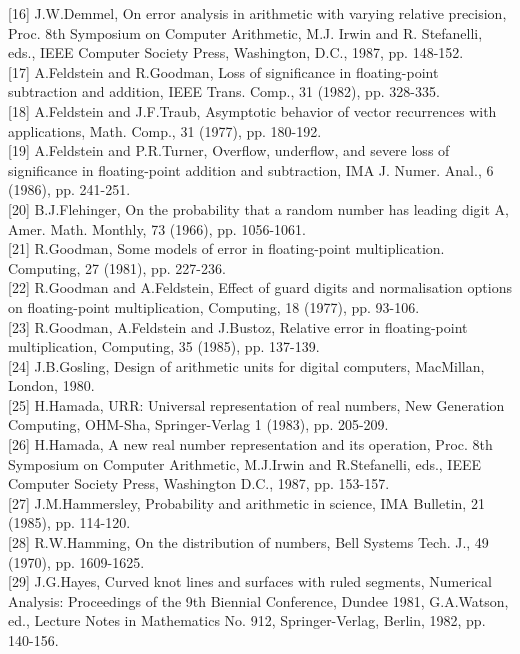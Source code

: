 \documentclass[10pt]{article}
\begin{document}
[16] J.W.Demmel, On error analysis in arithmetic with varying relative precision, Proc. 8th Symposium on Computer Arithmetic, M.J. Irwin and R. Stefanelli, eds., IEEE Computer Society Press, Washington, D.C., 1987, pp. 148-152.\\[0pt]
[17] A.Feldstein and R.Goodman, Loss of significance in floating-point subtraction and addition, IEEE Trans. Comp., 31 (1982), pp. 328-335.\\[0pt]
[18] A.Feldstein and J.F.Traub, Asymptotic behavior of vector recurrences with applications, Math. Comp., 31 (1977), pp. 180-192.\\[0pt]
[19] A.Feldstein and P.R.Turner, Overflow, underflow, and severe loss of significance in floating-point addition and subtraction, IMA J. Numer. Anal., 6 (1986), pp. 241-251.\\[0pt]
[20] B.J.Flehinger, On the probability that a random number has leading digit A, Amer. Math. Monthly, 73 (1966), pp. 1056-1061.\\[0pt]
[21] R.Goodman, Some models of error in floating-point multiplication. Computing, 27 (1981), pp. 227-236.\\[0pt]
[22] R.Goodman and A.Feldstein, Effect of guard digits and normalisation options on floating-point multiplication, Computing, 18 (1977), pp. 93-106.\\[0pt]
[23] R.Goodman, A.Feldstein and J.Bustoz, Relative error in floating-point multiplication, Computing, 35 (1985), pp. 137-139.\\[0pt]
[24] J.B.Gosling, Design of arithmetic units for digital computers, MacMillan, London, 1980.\\[0pt]
[25] H.Hamada, URR: Universal representation of real numbers, New Generation Computing, OHM-Sha, Springer-Verlag 1 (1983), pp. 205-209.\\[0pt]
[26] H.Hamada, A new real number representation and its operation, Proc. 8th Symposium on Computer Arithmetic, M.J.Irwin and R.Stefanelli, eds., IEEE Computer Society Press, Washington D.C., 1987, pp. 153-157.\\[0pt]
[27] J.M.Hammersley, Probability and arithmetic in science, IMA Bulletin, 21 (1985), pp. 114-120.\\[0pt]
[28] R.W.Hamming, On the distribution of numbers, Bell Systems Tech. J., 49 (1970), pp. 1609-1625.\\[0pt]
[29] J.G.Hayes, Curved knot lines and surfaces with ruled segments, Numerical Analysis: Proceedings of the 9th Biennial Conference, Dundee 1981, G.A.Watson, ed., Lecture Notes in Mathematics No. 912, Springer-Verlag, Berlin, 1982, pp. 140-156.\\[0pt]
\end{document}
